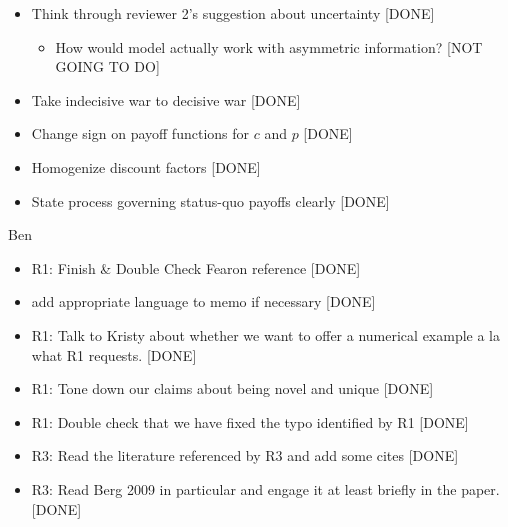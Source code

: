 \documentclass[12pt]{article}
\begin{document}
\begin{itemize}
\begin{itemize}
		\end{itemize}
	\item Think through reviewer 2's suggestion about uncertainty [DONE]
		\begin{itemize}
			\item How would model actually work with asymmetric information? [NOT GOING TO DO]
		\end{itemize}
	\item Take indecisive war to decisive war [DONE]
	\item Change sign on payoff functions for $c$ and $p$ [DONE]
	\item Homogenize discount factors [DONE]
	\item State process governing status-quo payoffs clearly [DONE]
\end{itemize}


Ben
\begin{itemize}
	\item R1: Finish \& Double Check Fearon reference [DONE]
		\item add appropriate language to memo if necessary [DONE]

	\item R1: Talk to Kristy about whether we want to offer a numerical example a la what R1 requests. [DONE]
	
	\item R1: Tone down our claims about being novel and unique [DONE]
	
	\item R1: Double check that we have fixed the typo identified by R1 [DONE]
	
	\item R3: Read the literature referenced by R3 and add some cites [DONE]
	
	\item R3: Read Berg 2009 in particular and engage it at least briefly in the paper. [DONE]

\end{itemize}
\end{document}
